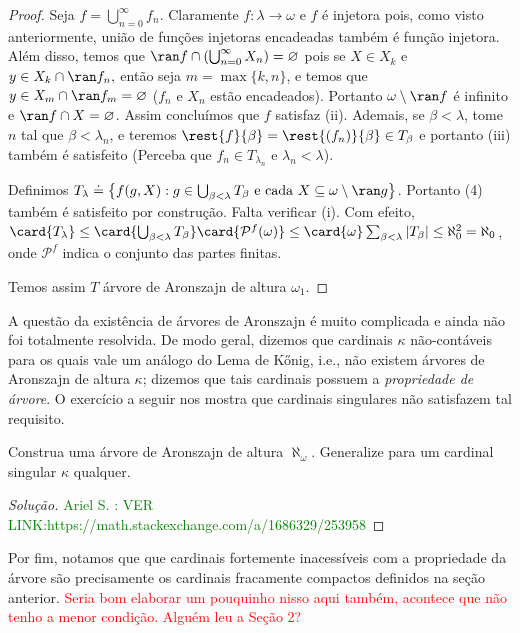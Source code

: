 \documentclass[a4paper]{article}
\theoremstyle{plain}\newtheorem{teo}{Teorema}[section]
\begin{document}
\begin{proof}
   Seja \(f = \bigcup_{n = 0}^{\infty}f_n\). Claramente \(f\colon
   \lambda\to \omega\) e  \(f\) é injetora pois, como visto anteriormente, união de funções injetoras encadeadas também é função injetora. Além disso, temos que \(\ran f \cap (\bigcup_{n = 0}^{\infty} X_n)
   = \varnothing\) pois se \(X\in X_k\) e \(y\in X_k\cap\ran f_n,\) então seja \(m=\max\{k,n\}\), e temos que \(y\in X_m\cap\ran f_m=\varnothing\) (\(f_n\) e \(X_n\) estão encadeados). Portanto \(\omega\setminus\ran f\) é infinito e \(\ran f \cap X =
   \varnothing\). Assim concluímos que \(f\) satisfaz (ii). Ademais, se  \(\beta <
   \lambda\), tome \(n\) tal que \(\beta < \lambda_n\), e teremos \(\rest{f} {\beta}= \rest{(f_{n})}{\beta}\in T_\beta\) e portanto (iii) também é satisfeito (Perceba que \(f_n\in T_{\lambda_n}\) e \(\lambda_n<\lambda\)).
   
   Definimos \(T_\lambda\doteq\big\{f(g,X) : g\in\bigcup_{\beta < \lambda} T_{\beta}\text{ e cada } X \subseteq \omega\setminus\ran g\big\}\). Portanto (4) também é satisfeito por construção. Falta verificar (i). Com efeito, \(\card{T_\lambda}\leq\card{\bigcup_{\beta<\lambda}T_{\beta}}\card{\mathcal P^f(\omega)} \le \card{\omega}\sum_{\beta<\lambda}|T_{\beta}| \le \aleph_0^2=\aleph_0\), onde \(\mathcal P^f\) indica o conjunto das partes finitas.
   
   Temos assim \(T\) árvore de Aronszajn de altura \(\omega_1\).

\end{proof}

 A questão da existência de árvores de Aronszajn é muito complicada e ainda não
 foi totalmente resolvida. De modo geral, dizemos que cardinais \(\kappa\)
 não-contáveis para os quais vale um  análogo do Lema de Kőnig, i.e., não
 existem árvores  de Aronszajn de altura $\kappa$; dizemos que tais cardinais
 possuem a  \textit{propriedade de árvore}. O exercício a seguir nos mostra que
 cardinais singulares não satisfazem tal requisito.

 \begin{exercicio}
  Construa uma árvore de Aronszajn de altura \(\aleph_{\omega}\). Generalize
  para um cardinal singular \(\kappa\) qualquer.
\end{exercicio}
\begin{proof}[Solução]
\textcolor{green}{Ariel S. : VER LINK:https://math.stackexchange.com/a/1686329/253958}
\end{proof}

 Por fim, notamos que que cardinais
 fortemente inacessíveis com a propriedade da árvore são precisamente os
 cardinais fracamente compactos definidos na seção anterior.
 \textcolor{red}{Seria bom elaborar um pouquinho nisso aqui também, acontece
   que não tenho a menor condição. Alguém leu a Seção 2?}

  
  
\end{document}

